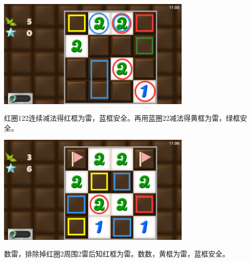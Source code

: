 \subsection{} %
\begin{center}
    \includegraphics[width=0.7\textwidth]{puzzle/126-1.png}
\end{center}
红圈122连续减法得红框为雷，蓝框安全。再用蓝圈22减法得黄框为雷，绿框安全。
\begin{center}
    \includegraphics[width=0.7\textwidth]{puzzle/126-2.png}
\end{center}
数雷，排除掉红圈2周围2雷后知红框为雷。数数，黄框为雷，蓝框安全。

